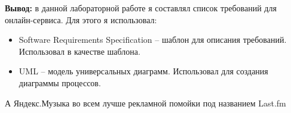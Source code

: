 \bigskip

\textbf{Вывод:}
в данной лабораторной работе я составлял список требований для онлайн-сервиса.
Для этого я использовал:
\begin{itemize}
    \item Software Requirements Specification -- шаблон для описания требований.
    Использовал в качестве шаблона.
    \item UML -- модель универсальных диаграмм.
    Использовал для создания диаграммы процессов.
\end{itemize}

А Яндекс.Музыка во всем лучше рекламной помойки под названием Last.fm
